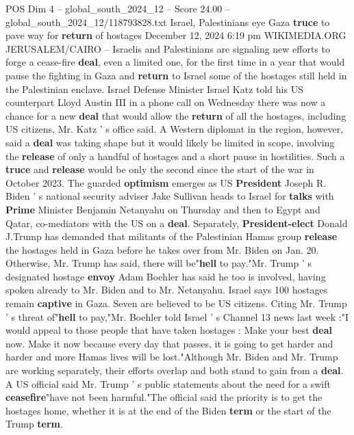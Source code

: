 \begin{textsample}{POS Dim 4 – global\_south\_2024\_12 – Score 24.00 – global\_south\_2024\_12/118793828.txt}  \label{ex:f4_pos_233}
Israel, Palestinians eye Gaza \textbf{truce} to pave way for \textbf{return} of hostages December 12, 2024 6:19 pm WIKIMEDIA.ORG JERUSALEM/CAIRO -- Israelis and Palestinians are signaling new efforts to forge a cease-fire \textbf{deal}, even a limited one, for the first time in a year that would pause the fighting in Gaza and \textbf{return} to Israel some of the hostages still held in the Palestinian enclave.
Israel Defense Minister Israel Katz told his US counterpart Lloyd Austin III in a phone call on Wednesday there was now a chance for a new \textbf{deal} that would allow the \textbf{return} of all the hostages, including US citizens, Mr.
Katz ' s office said.
A Western diplomat in the region, however, said a \textbf{deal} was taking shape but it would likely be limited in scope, involving the \textbf{release} of only a handful of hostages and a short pause in hostilities.
Such a \textbf{truce} and \textbf{release} would be only the second since the start of the war in October 2023.
The guarded \textbf{optimism} emerges as US \textbf{President} Joseph R.
Biden ' s national security adviser Jake Sullivan heads to Israel for \textbf{talks} with \textbf{Prime} Minister Benjamin Netanyahu on Thursday and then to Egypt and Qatar, co-mediators with the US on a \textbf{deal}.
Separately, \textbf{President-elect} Donald J.Trump has demanded that militants of the Palestinian Hamas group \textbf{release} the hostages held in Gaza before he takes over from Mr.
Biden on Jan. 20.
Otherwise, Mr.
Trump has said, there will be"\textbf{hell} to pay."Mr.
Trump ' s designated hostage \textbf{envoy} Adam Boehler has said he too is involved, having spoken already to Mr.
Biden and to Mr.
Netanyahu.
Israel says 100 hostages remain \textbf{captive} in Gaza.
Seven are believed to be US citizens.
Citing Mr.
Trump ' s threat of"\textbf{hell} to pay,"Mr.
Boehler told Israel ' s Channel 13 news last week :"I would appeal to those people that have taken hostages : Make your best \textbf{deal} now.
Make it now because every day that passes, it is going to get harder and harder and more Hamas lives will be lost."Although Mr.
Biden and Mr.
Trump are working separately, their efforts overlap and both stand to gain from a \textbf{deal}.
A US official said Mr.
Trump ' s public statements about the need for a swift \textbf{ceasefire}"have not been harmful."The official said the priority is to get the hostages home, whether it is at the end of the Biden \textbf{term} or the start of the Trump \textbf{term}.

\end{textsample}
